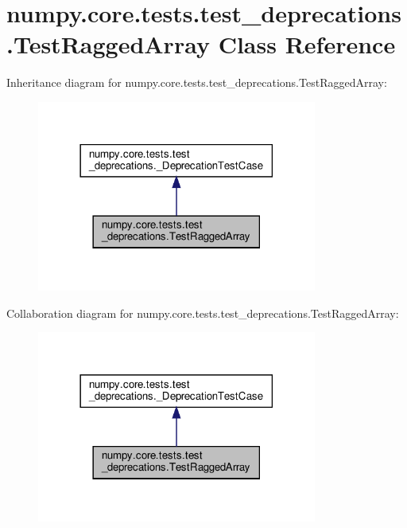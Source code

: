\hypertarget{classnumpy_1_1core_1_1tests_1_1test__deprecations_1_1TestRaggedArray}{}\section{numpy.\+core.\+tests.\+test\+\_\+deprecations.\+Test\+Ragged\+Array Class Reference}
\label{classnumpy_1_1core_1_1tests_1_1test__deprecations_1_1TestRaggedArray}


Inheritance diagram for numpy.\+core.\+tests.\+test\+\_\+deprecations.\+Test\+Ragged\+Array\+:
\nopagebreak
\begin{figure}[H]
\begin{center}
\leavevmode
\includegraphics[width=261pt]{classnumpy_1_1core_1_1tests_1_1test__deprecations_1_1TestRaggedArray__inherit__graph}
\end{center}
\end{figure}


Collaboration diagram for numpy.\+core.\+tests.\+test\+\_\+deprecations.\+Test\+Ragged\+Array\+:
\nopagebreak
\begin{figure}[H]
\begin{center}
\leavevmode
\includegraphics[width=261pt]{classnumpy_1_1core_1_1tests_1_1test__deprecations_1_1TestRaggedArray__coll__graph}
\end{center}
\end{figure}
